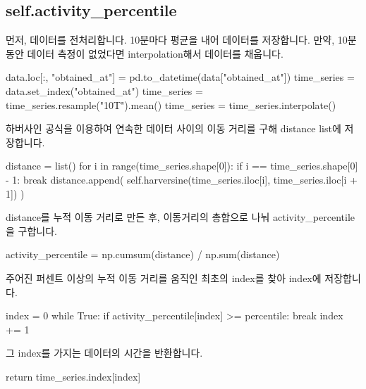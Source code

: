 \documentclass{oblivoir}
\begin{document}
  \subsection{self.activity\_percentile}
  먼저, 데이터를 전처리합니다. 10분마다 평균을 내어 데이터를 저장합니다.
  만약, 10분 동안 데이터 측정이 없었다면 interpolation해서 데이터를 채웁니다.
  \begin{python}[label={GPS_feature_47}]
    data.loc[:, "obtained_at"] = pd.to_datetime(data["obtained_at"])
    time_series = data.set_index("obtained_at")
    time_series = time_series.resample("10T").mean()
    time_series = time_series.interpolate()
  \end{python}
  하버사인 공식을 이용하여 연속한 데이터 사이의 이동 거리를 구해 distance list에 저장합니다.
  \begin{python}[label={GPS_feature_48}]
    distance = list()
    for i in range(time_series.shape[0]):
        if i == time_series.shape[0] - 1:
            break
        distance.append(
            self.harversine(time_series.iloc[i], time_series.iloc[i + 1])
        )
  \end{python}
  distance를 누적 이동 거리로 만든 후, 이동거리의 총합으로 나눠 activity\_percentile을 구합니다.
  \begin{python}[label={GPS_feature_49}]
    activity_percentile = np.cumsum(distance) / np.sum(distance)
  \end{python}
  주어진 퍼센트 이상의 누적 이동 거리를 움직인 최초의 index를 찾아 index에 저장합니다.
  \begin{python}[label={GPS_feature_50}]
    index = 0
    while True:
        if activity_percentile[index] >= percentile:
            break
        index += 1
  \end{python}
  그 index를 가지는 데이터의 시간을 반환합니다.
  \begin{python}[label={GPS_feature_51}]
    return time_series.index[index]
  \end{python}
  
\end{document}
